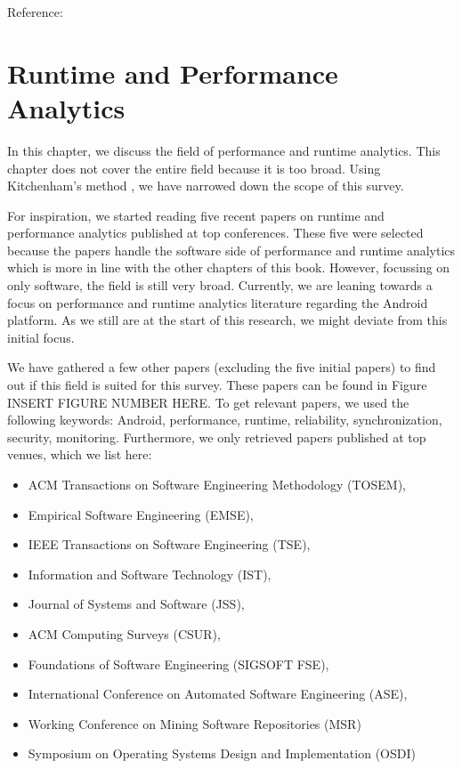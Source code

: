 \documentclass[]{book}
\providecommand{\tightlist}{%
  \setlength{\itemsep}{0pt}\setlength{\parskip}{0pt}}
\begin{document}
Reference: \citet{zanjani2016automatically}

\chapter{Runtime and Performance
Analytics}\label{runtime-and-performance-analytics}

In this chapter, we discuss the field of performance and runtime
analytics. This chapter does not cover the entire field because it is
too broad. Using Kitchenham's method \citep{kitchenham2004procedures},
we have narrowed down the scope of this survey.

For inspiration, we started reading five recent papers on runtime and
performance analytics published at top conferences. These five were
selected because the papers handle the software side of performance and
runtime analytics which is more in line with the other chapters of this
book. However, focussing on only software, the field is still very
broad. Currently, we are leaning towards a focus on performance and
runtime analytics literature regarding the Android platform. As we still
are at the start of this research, we might deviate from this initial
focus.

We have gathered a few other papers (excluding the five initial papers)
to find out if this field is suited for this survey. These papers can be
found in Figure INSERT FIGURE NUMBER HERE. To get relevant papers, we
used the following keywords: Android, performance, runtime, reliability,
synchronization, security, monitoring. Furthermore, we only retrieved
papers published at top venues, which we list here:

\begin{itemize}
\tightlist
\item
  ACM Transactions on Software Engineering Methodology (TOSEM),
\item
  Empirical Software Engineering (EMSE),
\item
  IEEE Transactions on Software Engineering (TSE),
\item
  Information and Software Technology (IST),
\item
  Journal of Systems and Software (JSS),
\item
  ACM Computing Surveys (CSUR),
\item
  Foundations of Software Engineering (SIGSOFT FSE),
\item
  International Conference on Automated Software Engineering (ASE),
\item
  Working Conference on Mining Software Repositories (MSR)
\item
  Symposium on Operating Systems Design and Implementation (OSDI)
\end{itemize}
\end{document}
